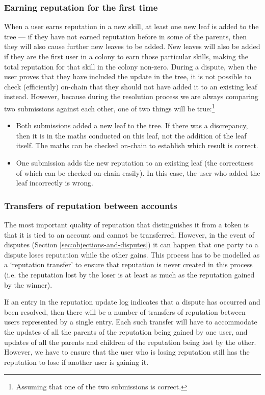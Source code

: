 \subsubsection{Earning reputation for the first time}\label{sec:earning-rep-for-first-time}
When a user earns reputation in a new skill, at least one new leaf is added to the tree --- if they have not earned reputation before in some of the parents, then they will also cause further new leaves to be added. New leaves will also be added if they are the first user in a colony to earn those particular skills, making the total reputation for that skill in the colony non-zero. During a dispute, when the user proves that they have included the update in the tree, it is not possible to check (efficiently) on-chain that they should not have added it to an existing leaf instead. However, because during the resolution process we are always comparing two submissions against each other, one of two things will be true:\footnote{Assuming that one of the two submissions is correct.}
\begin{itemize}
 \item Both submissions added a new leaf to the tree. If there was a discrepancy, then it is in the maths conducted on this leaf, not the addition of the leaf itself. The maths can be checked on-chain to establish which result is correct.
 \item One submission adds the new reputation to an existing leaf (the correctness of which can be checked on-chain easily). In this case, the user who added the leaf incorrectly is wrong.
\end{itemize}

\subsubsection{Transfers of reputation between accounts}\label{sec:reptransfer}

The most important quality of reputation that distinguishes it from a token is that it is tied to an account and cannot be transferred. However, in the event of disputes (Section \ref{sec:objections-and-disputes}) it can happen that one party to a dispute loses reputation while the other gains. This process has to be modelled as a `reputation transfer' to ensure that reputation is never created in this process (i.e. the reputation lost by the loser is at least as much as the reputation gained by the winner).

If an entry in the reputation update log indicates that a dispute has occurred and been resolved, then there will be a number of transfers of reputation between users represented by a single entry. Each such transfer will have to accommodate the updates of all the parents of the reputation being gained by one user, and updates of all the parents and children of the reputation being lost by the other. However, we have to ensure that the user who is losing reputation still has the reputation to lose if another user is gaining it.

